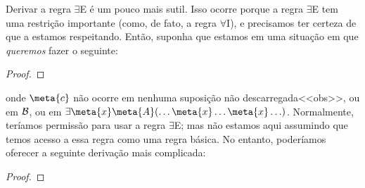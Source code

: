 Derivar a regra $\exists$E é um pouco mais sutil. Isso ocorre porque a regra $\exists$E tem uma restrição importante (como, de fato, a regra $\forall$I), e precisamos ter certeza de que a estamos respeitando. Então, suponha que estamos em uma situação em que \emph{queremos} fazer o seguinte: 

\begin{proof}
	\open
	\close
\end{proof}\noindent

onde $\meta{c}$ não ocorre em nenhuma suposição não descarregada<<obs>>, ou em $\mathcal{B}$, ou em $\exists \meta{x} \meta{A}(\ldots \meta{x} \ldots \meta{x}\ldots)$. Normalmente, teríamos permissão para usar a regra $\exists$E; mas não estamos aqui assumindo que temos acesso a essa regra como uma regra básica. No entanto, poderíamos oferecer a seguinte derivação mais complicada:
 
\begin{proof}
	\open
	\close
	\open
	\close
\end{proof}\noindent

